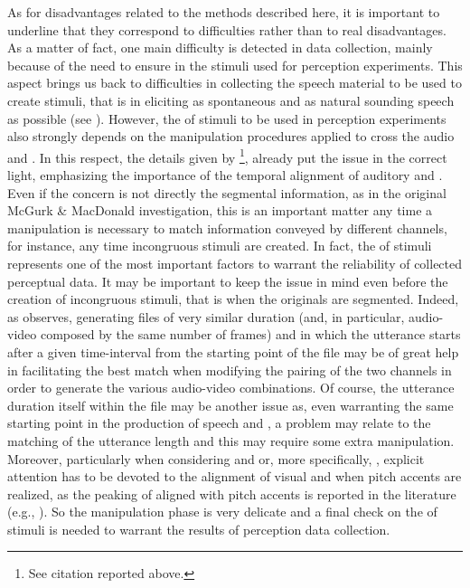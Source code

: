 \documentclass[output=paper]{langsci/langscibook}
\begin{document}
As for disadvantages related to the methods described here, it is important to underline that they correspond to difficulties rather than to real disadvantages. As a matter of fact, one main difficulty is detected in data collection, mainly because of the need to ensure  in the stimuli used for perception experiments. This aspect brings us back to difficulties in collecting the speech material to be used to create stimuli, that is in eliciting as spontaneous and as natural sounding speech as possible (see ). However, the  of stimuli to be used in perception experiments also strongly depends on the manipulation procedures applied to cross the audio and . In this respect, the details given by \citet[746]{McGurk1976}\footnote{See citation reported above.}, already put the issue in the correct light, emphasizing the importance of the temporal alignment of auditory and . Even if the concern is not directly the segmental information, as in the original McGurk \& MacDonald investigation, this is an important matter any time a manipulation is necessary to match information conveyed by different channels, for instance, any time incongruous stimuli are created. In fact, the  of stimuli represents one of the most important factors to warrant the reliability of collected perceptual data. It may be important to keep the issue in mind even before the creation of incongruous stimuli, that is when the originals are segmented. Indeed, as  \citet[211]{GiliFivela2015informazionimultimodali} observes, generating files of very similar duration (and, in particular, audio-video composed by the same number of frames) and in which the utterance starts after a given time-interval from the starting point of the file may be of great help in facilitating the best match when modifying the pairing of the two channels in order to generate the various audio-video combinations. Of course, the utterance duration itself within the file may be another issue as, even warranting the same starting point in the production of speech and , a problem may relate to the matching of the utterance length and this may require some extra manipulation. Moreover, particularly when considering  and  or, more specifically, , explicit attention has to be devoted to the alignment of visual and  when pitch accents are realized, as the peaking of  aligned with pitch accents is reported in the literature (e.g., \citealt{Cassell1994,Loehr2004,Swerts2008}). So the manipulation phase is very delicate and a final check on the  of stimuli is needed to warrant the results of perception data collection.
\end{document}
